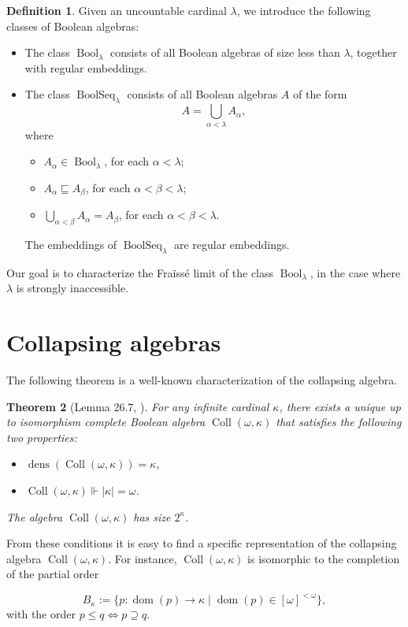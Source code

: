 \documentclass[11pt]{amsart}
\newtheorem{thm}{Theorem}[section]
\theoremstyle{definition}
\newtheorem{defin}[thm]{Definition}
\DeclareMathOperator{\dens}{dens}
\DeclareMathOperator{\Bool}{Bool}
\DeclareMathOperator{\BoolSeq}{BoolSeq}
\newcommand{\dom}{\operatorname{dom}}
\newcommand{\coll}{\operatorname{Coll}(\omega,\kappa)}
\begin{document}
\begin{defin}\label{classes} Given an uncountable cardinal $\lambda$, we introduce the following classes of Boolean algebras:
\begin{itemize}
    \item The class $\Bool_\lambda$ consists of all Boolean algebras of size less than $\lambda$, together with regular embeddings.
    \item The class $\BoolSeq_\lambda$ consists of all Boolean algebras $A$ of the form 
    $$A=\bigcup_{\alpha<\lambda}A_\alpha,$$
    where 
    \begin{itemize}
    \item $A_\alpha \in \Bool_\lambda$, for each $\alpha<\lambda$;
    \item $A_\alpha\sqsubseteq A_\beta$, for each $\alpha<\beta<\lambda$;
    \item $\bigcup\limits_{\alpha<\beta}A_\alpha=A_\beta$, for each $\alpha<\beta<\lambda$.
    \end{itemize}
    The embeddings of $\BoolSeq_\lambda$ are regular embeddings.
\end{itemize}
\end{defin}

Our goal is to characterize the Fra\"iss\'e limit of the class $\Bool_\lambda$, in the case where $\lambda$ is strongly inaccessible.

\section{Collapsing algebras}
The following theorem is a well-known characterization of the collapsing algebra.
\begin{thm}[Lemma 26.7, \cite{jech}] \label{thm1}
	For any infinite cardinal $\kappa$, there exists a unique up to isomorphism complete Boolean algebra $\coll$ that satisfies the following two properties:
	\begin{itemize}
	\item $\dens(\coll)=\kappa$,
	\item $\coll \Vdash |\kappa|=\omega$.
	\end{itemize}
	The algebra $\coll$ has size $2^\kappa$.
\end{thm}

From these conditions it is easy to find a specific representation of the collapsing algebra $\coll$. For instance, $\coll$ is isomorphic to the completion of the partial order

$$B_\kappa := \{p:\dom(p)\longrightarrow \kappa \mid \dom(p)\in [\omega]^{<\omega}\},$$
with the order $p\leq q \iff p \supseteq q$.
\end{document}

